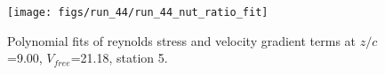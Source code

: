 \begin{figure}[H]
\centering
\texttt{[image: figs/run\_44/run\_44\_nut\_ratio\_fit]}
\caption{Polynomial fits of reynolds stress and velocity gradient terms at $z/c$=9.00, $V_{free}$=21.18, station 5.}
\label{fig:run_44_nut_ratio_fit}
\end{figure}


